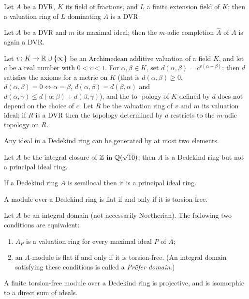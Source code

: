 \begin{exercise}\label{ex:11.2-ex}
Let $A$ be a DVR, $K$ its field of fractions, and $L$ a finite extension field of $K$;
then a valuation ring of $L$ dominating $A$ is a DVR.
\end{exercise}

\begin{exercise}\label{ex:11.3-ex}
Let $A$ be a DVR and $m$ its maximal ideal; then the $m$-adic completion $\hat{A}$ of
$A$ is again a DVR.
\end{exercise}

\begin{exercise}\label{ex:11.4-ex}
Let $v\colon K \to \mathbb{R} \cup \{\infty\}$ be an Archimedean additive valuation of a field $K$,
and let $c$ be a real number with $0 < c < 1$. For $\alpha, \beta \in K$, set $d(\alpha, \beta) = c^{v(\alpha-\beta)}$;
then $d$ satisfies the axioms for a metric on $K$ (that is $d(\alpha, \beta) \ge 0$, $d(\alpha, \beta)
= 0 \iff \alpha = \beta$, $d(\alpha, \beta) = d(\beta, \alpha)$ and $d(\alpha, \gamma) \le d(\alpha, \beta) + d(\beta, \gamma)$), and the to-
pology of $K$ defined by $d$ does not depend on the choice of $c$. Let $R$ be the
valuation ring of $v$ and $m$ its valuation ideal; if $R$ is a DVR then the
topology determined by $d$ restricts to the $m$-adic topology on $R$.
\end{exercise}

\begin{exercise}\label{ex:11.5-ex}
Any ideal in a Dedekind ring can be generated by at most two elements.
\end{exercise}

\begin{exercise}\label{ex:11.6-ex}
Let $A$ be the integral closure of $\mathbb{Z}$ in $\mathbb{Q}(\sqrt{10})$; then $A$ is a Dedekind ring but
not a principal ideal ring.
\end{exercise}

\begin{exercise}\label{ex:11.7-ex}
If a Dedekind ring $A$ is semilocal then it is a principal ideal ring.
\end{exercise}

\begin{exercise}\label{ex:11.8-ex}
A module over a Dedekind ring is flat if and only if it is torsion-free.
\end{exercise}

\begin{exercise}\label{ex:11.9-ex}
Let $A$ be an integral domain (not necessarily Noetherian). The following
two conditions are equivalent:
\begin{enumerate}[(1)]
  \item $A_P$ is a valuation ring for every maximal ideal $P$ of $A$;
  \item an $A$-module is flat if and only if it is torsion-free. (An integral
        domain satisfying these conditions is called a \emph{Pr\"ufer domain}.)
\end{enumerate}
\end{exercise}

\begin{exercise}\label{ex:11.10-ex}
A finite torsion-free module over a Dedekind ring is projective, and is
isomorphic to a direct sum of ideals.
\end{exercise}
